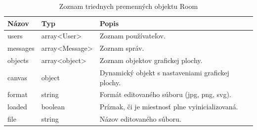 \begin{table}
	\begin{tabular}{ | m{3cm} | m{3cm}| m{6.5cm} | } \hline
		\textbf{Názov} & \textbf{Typ} & \textbf{Popis} \\ \hline \hline
	
		users & array<User> & Zoznam používateľov. \\\hline
		messages & array<Message> & Zoznam správ. \\\hline
		objects & array<object> & Zoznam objektov grafickej plochy. \\\hline
		canvas & object & Dynamický objekt s nastaveniami grafickej plochy. \\\hline
		format & string & Formát editovaného súboru (jpg, png, svg).\\\hline
		loaded & boolean & Príznak, či je miestnosť plne vyinicializovaná. \\\hline
		file & string & Názov editovaného súboru. \\\hline
	
		\hline
	\end{tabular}
	\caption{Zoznam triednych premenných objektu Room}
	\label{tab:server-prop-room}
\end{table}


